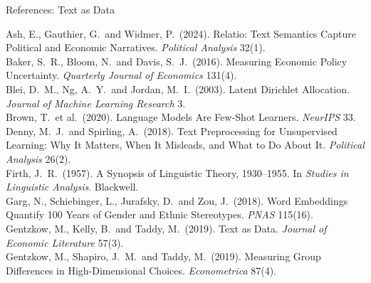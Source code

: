 \documentclass[svgnames,x11names,dvipsnames]{beamer}
\newcommand{\new}[1]{#1}
\begin{document}
\begin{frame}{\new{References: Text as Data}}
\vspace{0.05cm}
\raggedright
{\scriptsize
Ash, E., Gauthier, G.\ and Widmer, P.\ (2024). Relatio: Text Semantics Capture Political and Economic Narratives. \textit{Political Analysis} 32(1).\\[0.06cm]
Baker, S.\ R., Bloom, N.\ and Davis, S.\ J.\ (2016). Measuring Economic Policy Uncertainty. \textit{Quarterly Journal of Economics} 131(4).\\[0.06cm]
Blei, D.\ M., Ng, A.\ Y.\ and Jordan, M.\ I.\ (2003). Latent Dirichlet Allocation. \textit{Journal of Machine Learning Research} 3.\\[0.06cm]
Brown, T.\ et al.\ (2020). Language Models Are Few-Shot Learners. \textit{NeurIPS} 33.\\[0.06cm]
Denny, M.\ J.\ and Spirling, A.\ (2018). Text Preprocessing for Unsupervised Learning: Why It Matters, When It Misleads, and What to Do About It. \textit{Political Analysis} 26(2).\\[0.06cm]
Firth, J.\ R.\ (1957). A Synopsis of Linguistic Theory, 1930--1955. In \textit{Studies in Linguistic Analysis}. Blackwell.\\[0.06cm]
Garg, N., Schiebinger, L., Jurafsky, D.\ and Zou, J.\ (2018). Word Embeddings Quantify 100 Years of Gender and Ethnic Stereotypes. \textit{PNAS} 115(16).\\[0.06cm]

Gentzkow, M., Kelly, B.\ and Taddy, M.\ (2019). Text as Data. \textit{Journal of Economic Literature} 57(3).\\[0.06cm]
Gentzkow, M., Shapiro, J.\ M.\ and Taddy, M.\ (2019). Measuring Group Differences in High-Dimensional Choices. \textit{Econometrica} 87(4).\\[0.06cm]
}
\end{frame}
\end{document}
